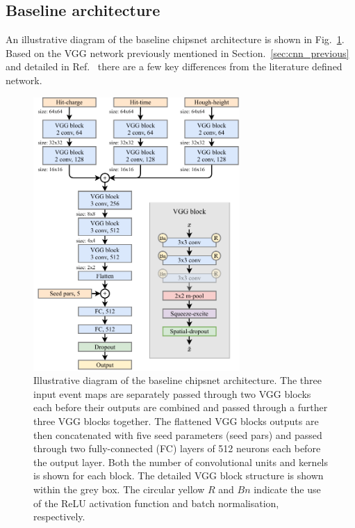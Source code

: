 \subsection{Baseline architecture} %
\label{sec:cnn_baseline_arch} %

An illustrative diagram of the baseline chipsnet architecture is shown in Fig.~\ref{fig:chipsnet}.
Based on the VGG network previously mentioned in Section.~\ref{sec:cnn_previous} and detailed in
Ref.~\cite{simonyan2014} there are a few key differences from the literature defined network.

\begin{figure} %
    \includegraphics[width=0.7\textwidth]{diagrams/6-cnn/chipsnet.pdf}
    \caption[Illustrative diagram of the baseline chipsnet architecture]
    {Illustrative diagram of the baseline chipsnet architecture. The three input event maps are
        separately passed through two VGG blocks each before their outputs are combined and passed
        through a further three VGG blocks together. The flattened VGG blocks outputs are then
        concatenated with five seed parameters (seed pars) and passed through two fully-connected
        (FC) layers of 512 neurons each before the output layer. Both the number of convolutional
        units and kernels is shown for each block. The detailed VGG block structure is shown
        within the grey box. The circular yellow $R$ and $Bn$ indicate the use of the ReLU
        activation function and batch normalisation, respectively.}
    \label{fig:chipsnet}
\end{figure}


